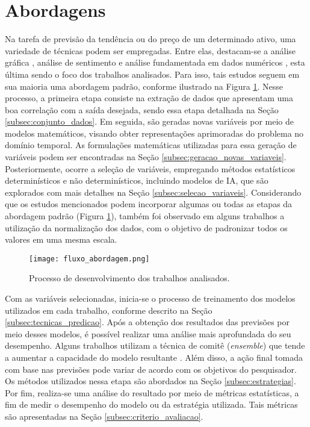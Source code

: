 \section{Abordagens}
\label{subsec:abordagem}
Na tarefa de previsão da tendência ou do preço de um determinado ativo, uma variedade de técnicas podem ser empregadas. Entre elas, destacam-se a análise gráfica \cite{matsura2017comprar}, análise de sentimento \cite{igarashi2021analise} e análise fundamentada em dados numéricos \cite{halil2019predicting}, esta última sendo o foco dos trabalhos analisados. Para isso, tais estudos seguem em sua maioria uma abordagem padrão, conforme ilustrado na Figura \ref{fig:abordagemPadrao}. Nesse processo, a primeira etapa consiste na extração de dados que apresentam uma boa correlação com a saída desejada, sendo essa etapa detalhada na Seção \ref{subsec:conjunto_dados}. Em seguida, são geradas novas variáveis por meio de modelos matemáticos, visando obter representações aprimoradas do problema no domínio temporal. As formulações matemáticas utilizadas para essa geração de variáveis podem ser encontradas na Seção \ref{subsec:geracao_novas_variaveis}. Posteriormente, ocorre a seleção de variáveis, empregando métodos estatísticos determinísticos e não determinísticos, incluindo modelos de \ac{IA}, que são explorados com mais detalhes na Seção \ref{subsec:selecao_variaveis}. Considerando que os estudos mencionados podem incorporar algumas ou todas as etapas da abordagem padrão (Figura \ref{fig:abordagemPadrao}), também foi observado em alguns trabalhos a utilização da normalização dos dados, com o objetivo de padronizar todos os valores em uma mesma escala.

\begin{figure}[htbp]
    \caption{Processo de desenvolvimento dos trabalhos analisados.}
      \centering
      \texttt{[image: fluxo\_abordagem.png]} 
    \label{fig:abordagemPadrao}
\end{figure}

Com as variáveis selecionadas, inicia-se o processo de treinamento dos modelos utilizados em cada trabalho, conforme descrito na Seção \ref{subsec:tecnicas_predicao}. Após a obtenção dos resultados das previsões por meio desses modelos, é possível realizar uma análise mais aprofundada do seu desempenho. Alguns trabalhos utilizam a técnica de comitê (\textit{ensemble}) que tende a aumentar a capacidade do modelo resultante \cite{sagi2018ensemble}. Além disso, a ação final tomada com base nas previsões pode variar de acordo com os objetivos do pesquisador. Os métodos utilizados nessa etapa são abordados na Seção \ref{subsec:estrategias}. Por fim, realiza-se uma análise do resultado por meio de métricas estatísticas, a fim de medir o desempenho do modelo ou da estratégia utilizada. Tais métricas são apresentadas na Seção \ref{subsec:criterio_avaliacao}. 



